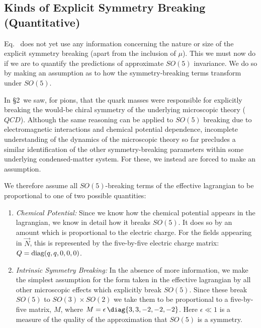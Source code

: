 \documentclass[12pt]{report}
\begin{document}
\subsection{Kinds of Explicit Symmetry Breaking
(Quantitative)}

Eq.~ does not yet use any information
concerning the nature or size of the explicit symmetry
breaking (apart from the inclusion of $\mu$). This we must
now do if we are to quantify the predictions of approximate
$SO(5)$ invariance. We do so by making an assumption as to
how the symmetry-breaking  terms transform under $SO(5)$.

In \S2\ we saw, for pions, that the quark masses were
responsible for explicitly breaking the would-be chiral
symmetry of the underlying microscopic theory ($QCD$).
Although the same reasoning can be applied to $SO(5)$
breaking due to electromagnetic interactions and chemical
potential dependence, incomplete understanding of the
dynamics of the microscopic theory so far precludes a
similar identification of the other symmetry-breaking
parameters within some underlying condensed-matter system.
For these, we instead are forced to make an assumption.

We therefore assume all $SO(5)$-breaking terms of the
effective lagrangian to be proportional to one of two
possible quantities:

\begin{enumerate}

\item
{\it Chemical Potential:}
Since we know how the chemical potential appears in the
lagrangian, we know in detail how it breaks $SO(5)$. It
does so by an amount which is proportional to the electric
charge. For the fields appearing in $\vec{N}$, this is
represented by the five-by-five electric charge matrix: $Q
= \hbox{diag}(q,q,0,0,0)$.

\item
{\it Intrinsic Symmetry Breaking:}
In the absence of more information, we make the simplest
assumption for the form taken in the effective lagrangian
by all other microscopic effects which explicitly break
$SO(5)$. Since these break $SO(5)$ to $SO(3)\times SO(2)$
we take them to be proportional to a five-by-five matrix,
$M$, where $M = \epsilon 
\,\diag{3,3,-2,-2,-2}$. Here $\epsilon \ll 1$ is a measure
of the quality of the approximation that $SO(5)$ is a
symmetry.

\end{enumerate}
\end{document}
